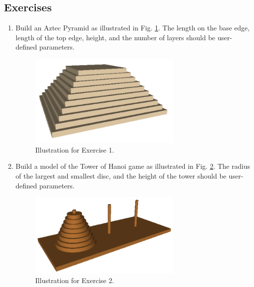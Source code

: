 \documentclass{article}
\begin{document}
\subsection{Exercises}

\begin{enumerate}

\item Build an Aztec Pyramid as illustrated in Fig. \ref{fig:aztec}. The length 
on the base edge, length of the top edge, height, and the number of layers
should be user-defined parameters. 


\begin{figure}[!ht]
\begin{center}
\includegraphics[width=0.7\textwidth]{img/aztec.png}
\end{center}
\vspace{-2mm}
\caption{Illustration for Exercise 1.}
\label{fig:aztec}
\end{figure}
\noindent

\item Build a model of the Tower of Hanoi game as illustrated in Fig. \ref{fig:hanoi}. 
The radius of the largest and smallest disc, and the height of the tower 
should be user-defined parameters. 

\newpage

\begin{figure}[!ht]
\begin{center}
\includegraphics[width=0.7\textwidth]{img/hanoi.png}
\end{center}
\vspace{-2mm}
\caption{Illustration for Exercise 2.}
\label{fig:hanoi}
\end{figure}
\noindent


\end{enumerate}
\end{document}
